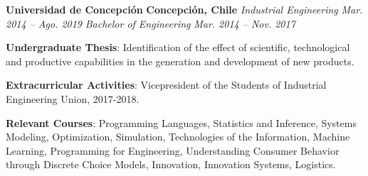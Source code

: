 \item
\headerrow
{\textbf{Universidad de Concepción}}
{\textbf{Concepción, Chile}}
\headerrow
{\emph{Industrial Engineering}}
{\emph{Mar. 2014 -- Ago. 2019}}
\headerrow
{\emph{Bachelor of Engineering}}
{\emph{Mar. 2014 -- Nov. 2017}}
\begin{itemize*}
    \item \textbf{Undergraduate Thesis}: Identification of the effect of scientific, 
    technological and productive capabilities in the generation and development of 
    new products.
    \item \textbf{Extracurricular Activities}: Vicepresident of the Students of Industrial
    Engineering Union, 2017-2018.
    \item \textbf{Relevant Courses}: Programming Languages, Statistics and
    Inference, Systems Modeling, Optimization, Simulation, Technologies
    of the Information, Machine Learning, Programming for Engineering, 
    Understanding Consumer Behavior through Discrete Choice Models, Innovation, 
    Innovation Systems, Logistics.
\end{itemize*}